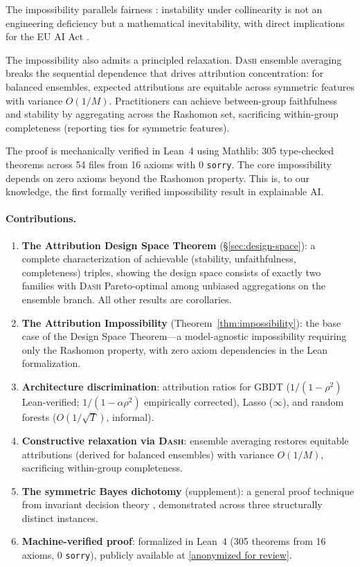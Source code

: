 \documentclass{article}
\newcommand{\DASH}{\textsc{Dash}}
\newcommand{\GBDT}{\textsc{GBDT}}
\begin{document}
The impossibility parallels fairness \citep{chouldechova2017fair,kleinberg2017inherent}: instability under collinearity is not an engineering deficiency but a mathematical inevitability, with direct implications for the EU AI Act \citep{euaiact2024}.

The impossibility also admits a principled relaxation.
\DASH{} ensemble averaging breaks the sequential dependence that drives attribution concentration: for balanced ensembles, expected attributions are equitable across symmetric features with variance $O(1/M)$.
Practitioners can achieve between-group faithfulness and stability by aggregating across the Rashomon set, sacrificing within-group completeness (reporting ties for symmetric features).

The proof is mechanically verified in Lean~4 using Mathlib: 305 type-checked theorems across 54 files from 16 axioms with 0 \texttt{sorry}.
The core impossibility depends on zero axioms beyond the Rashomon property.
This is, to our knowledge, the first formally verified impossibility result in explainable AI.

\paragraph{Contributions.}
\begin{enumerate}
    \item \textbf{The Attribution Design Space Theorem} (\S\ref{sec:design-space}): a complete characterization of achievable (stability, unfaithfulness, completeness) triples, showing the design space consists of exactly two families with \DASH{} Pareto-optimal among unbiased aggregations on the ensemble branch. All other results are corollaries.
    \item \textbf{The Attribution Impossibility} (Theorem~\ref{thm:impossibility}): the base case of the Design Space Theorem---a model-agnostic impossibility requiring only the Rashomon property, with zero axiom dependencies in the Lean formalization.
    \item \textbf{Architecture discrimination}: attribution ratios for \GBDT{} ($1/(1{-}\rho^2)$ Lean-verified; $1/(1{-}\alpha\rho^2)$ empirically corrected), Lasso ($\infty$), and random forests ($O(1/\sqrt{T})$, informal).
    \item \textbf{Constructive relaxation via \DASH{}}: ensemble averaging restores equitable attributions (derived for balanced ensembles) with variance $O(1/M)$, sacrificing within-group completeness.
    \item \textbf{The symmetric Bayes dichotomy} (supplement): a general proof technique from invariant decision theory \citep{lehmann2005testing}, demonstrated across three structurally distinct instances.
    \item \textbf{Machine-verified proof}: formalized in Lean~4 (305 theorems from 16 axioms, 0 \texttt{sorry}), publicly available at \url{[anonymized for review]}.
\end{enumerate}
\end{document}
